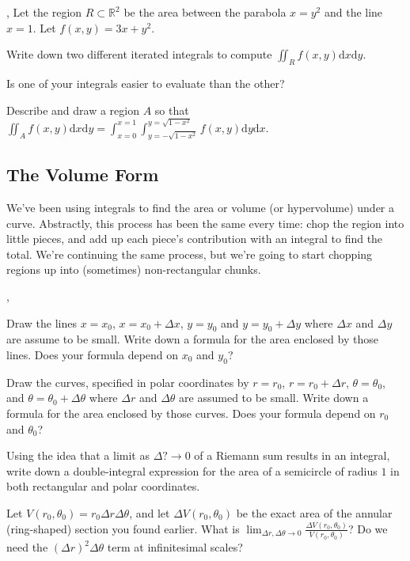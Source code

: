 \documentclass[letter]{article}
\newcommand{\R}{\mathbb{R}}
\renewcommand{\d}{\mathrm{d}}
\newcommand{\sepl}{\sep \vspace{-.35in}}
\begin{document}
	\sep
	Let the region $R\subset \R^2$ be the area between the parabola $x=y^2$ and the line $x=1$.  Let 
	$f(x,y)=3x+y^2$.
	\begin{Enum}
		\item Write down two different iterated integrals to compute $\displaystyle \iint_R f(x,y)\d x\d y$.
		\item Is one of your integrals easier to evaluate than the other?
		\item Describe and draw a region $A$ so that 
			$\displaystyle\iint_A f(x,y)\d x\d y = \int_{x=0}^{x=1}\int_{y=-\sqrt{1-x^2}}^{y=\sqrt{1-x^2}} f(x,y)\d y\d x$.
	\end{Enum}

\subsection*{The Volume Form}
	We've been using integrals to find the area or volume (or hypervolume) under a curve.
	Abstractly, this process has been the same every time: chop the region into little pieces, and
	add up each piece's contribution with an integral to find the total.  We're continuing the same
	process, but we're going to start chopping regions up into (sometimes) non-rectangular chunks.

	\sepl
	\begin{Enum}
		\item Draw the lines $x=x_0$, $x=x_0+\Delta x$, $y=y_0$ and $y=y_0+\Delta y$ where
			$\Delta x$ and $\Delta y$ are assume to be small.  Write down a formula for the area enclosed by
			those lines.  Does your formula depend on $x_0$ and $y_0$?
		\item Draw the curves, specified in polar coordinates by $r=r_0$, $r=r_0+\Delta r$, $\theta = \theta_0$,
			and $\theta = \theta_0+\Delta\theta$ where $\Delta r$ and $\Delta \theta$ are assumed to
			be small.  Write down a formula for the area enclosed by those curves.  Does your
			formula depend on $r_0$ and $\theta_0$?
		\item Using the idea that a limit as $\Delta ?\to 0$ of a Riemann sum results in an integral, 
			write down a double-integral expression for the area of a semicircle of radius $1$
			in both rectangular and polar coordinates.
		\item Let $V(r_0,\theta_0) = r_0\Delta r\Delta\theta$, and let $\Delta V(r_0,\theta_0)$ be the exact
			area of the annular (ring-shaped) section you found earlier.  What is $\displaystyle \lim_{\Delta r, \Delta\theta\to 0}
			\frac{\Delta V(r_0,\theta_0)}{V(r_0,\theta_0)}$?  Do we need the $(\Delta r)^2\Delta \theta$ term
			at infinitesimal scales?
	\end{Enum}
\end{document}
